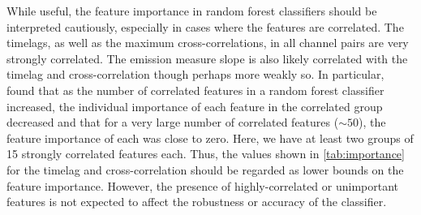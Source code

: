 While useful, the feature importance in random forest classifiers should be interpreted cautiously, especially in cases where the features are correlated. The timelags, as well as the maximum cross-correlations, in all channel pairs are very strongly correlated. The emission measure slope is also likely correlated with the timelag and cross-correlation though perhaps more weakly so. In particular, \citet{altmann_permutation_2010} found that as the number of correlated features in a random forest classifier increased, the individual importance of each feature in the correlated group decreased and that for a very large number of correlated features ($\sim50$), the feature importance of each was close to zero. Here, we have at least two groups of 15 strongly correlated features each. Thus, the values shown in \autoref{tab:importance} for the timelag and cross-correlation should be regarded as lower bounds on the feature importance. However, the presence of highly-correlated or unimportant features is not expected to affect the robustness or accuracy of the classifier.
